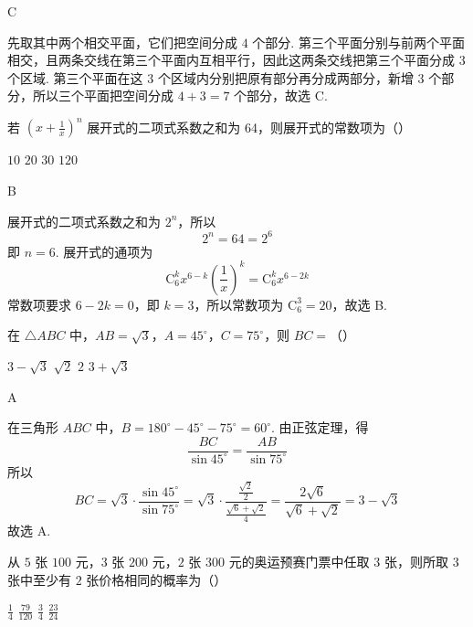 \begin{answer}
C
\end{answer}

\begin{solution}
先取其中两个相交平面，它们把空间分成 \(4\) 个部分. 第三个平面分别与前两个平面相交，且两条交线在第三个平面内互相平行，因此这两条交线把第三个平面分成 \(3\) 个区域. 第三个平面在这 \(3\) 个区域内分别把原有部分再分成两部分，新增 \(3\) 个部分，所以三个平面把空间分成 \(4+3=7\) 个部分，故选 C.
\end{solution}

\begin{problem}
若 \(\left(x + \frac{1}{x}\right)^n\) 展开式的二项式系数之和为 64，则展开式的常数项为（\quad）

\choices
    {\(10\)}
    {\(20\)}
    {\(30\)}
    {\(120\)}
\end{problem}

\begin{answer}
B
\end{answer}

\begin{solution}
展开式的二项式系数之和为 \(2^n\)，所以
\[
2^n=64=2^6
\]
即 \(n=6\). 展开式的通项为
\[
\mathrm C_6^k x^{6-k}\left(\frac{1}{x}\right)^k=\mathrm C_6^k x^{6-2k}
\]
常数项要求 \(6-2k=0\)，即 \(k=3\)，所以常数项为 \(\mathrm C_6^3=20\)，故选 B.
\end{solution}

\begin{problem}
在 \(\triangle ABC\) 中，\(AB = \sqrt{3}\)，\(A = 45^{\circ}\)，\(C = 75^{\circ}\)，则 \(BC =\)（\quad）

\choices
    {\(3 - \sqrt{3}\)}
    {\(\sqrt{2}\)}
    {\(2\)}
    {\(3 + \sqrt{3}\)}
\end{problem}

\begin{answer}
A
\end{answer}

\begin{solution}
在三角形 \(ABC\) 中，\(B=180^{\circ}-45^{\circ}-75^{\circ}=60^{\circ}\). 由正弦定理，得
\[
\frac{BC}{\sin45^{\circ}}=\frac{AB}{\sin75^{\circ}}
\]
所以
\[
BC=\sqrt{3}\cdot\frac{\sin45^{\circ}}{\sin75^{\circ}}=\sqrt{3}\cdot\frac{\frac{\sqrt{2}}{2}}{\frac{\sqrt{6}+\sqrt{2}}{4}}=\frac{2\sqrt{6}}{\sqrt{6}+\sqrt{2}}=3-\sqrt{3}
\]
故选 A.
\end{solution}

\begin{problem}
从 \(5\) 张 \(100\text{ 元}\)，\(3\) 张 \(200\text{ 元}\)，\(2\) 张 \(300\text{ 元}\)的奥运预赛门票中任取 \(3\) 张，则所取 \(3\) 张中至少有 \(2\) 张价格相同的概率为（\quad）

\choices
    {\( \frac{1}{4} \)}
    {\( \frac{79}{120} \)}
    {\( \frac{3}{4} \)}
    {\( \frac{23}{24} \)}
\end{problem}

